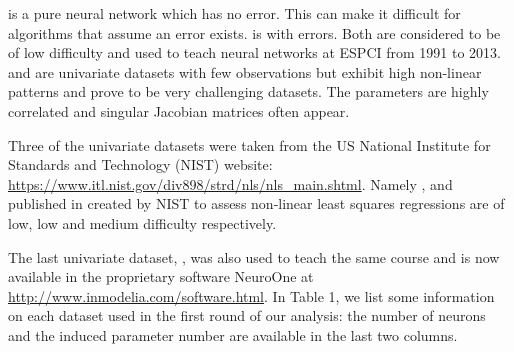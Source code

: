  is a pure neural network which has no error. This can
make it difficult for algorithms that assume an error exists.
 is  with errors. Both are considered to
be of low difficulty and used to teach neural networks at ESPCI from
1991 to 2013.  and  are univariate datasets
with few observations but exhibit high non-linear patterns and prove to
be very challenging datasets. The parameters are highly correlated and
singular Jacobian matrices often appear.

Three of the univariate datasets were taken from the US National
Institute for Standards and Technology (NIST) website:
\url{https://www.itl.nist.gov/div898/strd/nls/nls_main.shtml}. Namely
,  and  published in
\citep[resp.]{rustnist96:Gauss1,rustnist96:Gauss2,rustnist96:Gauss3}
created by NIST to assess non-linear least squares regressions are of
low, low and medium difficulty respectively.

The last univariate dataset, , was also used to teach
the same course and is now available in the proprietary software
NeuroOne at \url{http://www.inmodelia.com/software.html}. In Table 1, we
list some information on each dataset used in the first round of our
analysis: the number of neurons and the induced parameter number are
available in the last two columns.


